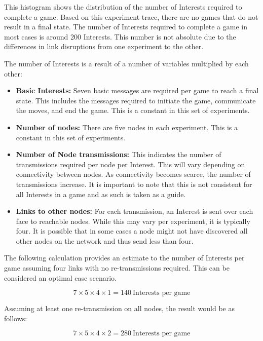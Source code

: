 \documentclass[a4paper,12pt]{report}      %
\begin{document}
This histogram shows the distribution of the number of Interests required to complete a game. 
Based on this experiment trace, there are no games that do not result in a final state.
The number of Interests required to complete a game in most cases is around 200 Interests. This number is not
absolute due to the differences in link disruptions from one experiment to the other.

The number of Interests is a result of a number of variables multiplied by each other:

\begin{itemize}
\item \textbf{Basic Interests:} Seven basic messages are required per game to reach a final state. This includes the messages required to initiate the game, communicate the moves, and end the game. This is a constant in this set of experiments.
\item \textbf{Number of nodes:} There are five nodes in each experiment. This is a constant in this set of experiments.
\item \textbf{Number of Node transmissions:} This indicates the number of transmissions required per node per Interest. This will vary depending on connectivity between nodes. As connectivity becomes scarce, the number of transmissions increase. It is important to note that this is not consistent for all Interests in a game and as such is taken as a guide.
\item \textbf{Links to other nodes:} For each transmission, an Interest is sent over each face to reachable nodes. While this may vary per experiment, it is typically four. It is possible that in some cases a node might not have discovered all other nodes on the network and thus send less than four.
\end{itemize}

The following calculation provides an estimate to the number of Interests per game assuming four links with no re-transmissions required. This can be considered an optimal case scenario.

\begin{displaymath} 7 \times 5 \times 4 \times 1 = 140\ \text{Interests per game} \end{displaymath}

Assuming at least one re-transmission on all nodes, the result would be as follows:

\begin{displaymath} 7 \times 5 \times 4 \times 2 = 280\ \text{Interests per game} \end{displaymath}
\end{document}
